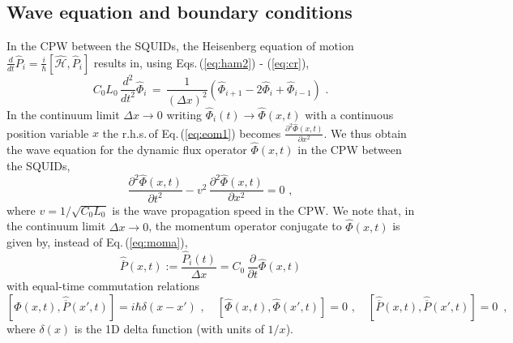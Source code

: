 
\subsection{Wave equation and boundary conditions}

In the CPW between the SQUIDs, the Heisenberg equation of motion 
$\displaystyle \frac{d}{dt} \hat{P}_i = \frac{i}{\hbar} \left[\hat{\mathcal{H}}, \hat{P}_i \right]$ 
results in, using Eqs.\,(\ref{eq:ham2}) - (\ref{eq:cr}), 
%
\begin{equation} \label{eq:eom1}
C_0 L_0 \, \frac{d^2}{dt^2} \hat{\Phi}_i \, = \, 
\frac{1}{(\Delta x)^2} \left(\hat{\Phi}_{i+1} - 2 \hat{\Phi}_i +  \hat{\Phi}_{i-1} \right) \, \, .
\end{equation}
%
In the continuum limit $\Delta x \to 0$ writing $\hat{\Phi}_i(t) \to \hat{\Phi}(x,t)$ 
with a continuous position variable $x$ the r.h.s.\,of Eq.\,(\ref{eq:eom1}) becomes
$\displaystyle \frac{\partial^2\hat{\Phi}(x,t)}{\partial x^2}$. 
We thus obtain the wave equation for the dynamic flux operator
$\hat{\Phi}(x,t)$ in the CPW between the SQUIDs,
%
\begin{equation} \label{eq:eom2}
\frac{\partial^2\hat{\Phi}(x,t)}{\partial t^2} - v^2 \, \frac{\partial^2\hat{\Phi}(x,t)}{\partial x^2} = 0 \, \, ,
\end{equation}
%
where $v = 1 / \sqrt{C_0 L_0}$ is the wave propagation speed in the CPW.
We note that, in the continuum limit $\Delta x \to 0$, 
the momentum operator conjugate to $\hat{\Phi}(x,t)$ is given by,
instead of Eq.\,(\ref{eq:moma}), 
%
\begin{equation} \label{eq:mom2} 
\hat{\overline{P}}(x,t) := \frac{\hat{P}_{i}(t)}{\Delta x} = 
C_0 \, \frac{\partial}{\partial t} \hat{\Phi}(x,t)
\end{equation}
%
with equal-time commutation relations
%
\begin{equation} \label{eq:cr2} 
\left[\hat{\Phi}(x,t), \hat{\overline{P}}(x',t) \right] = i \hbar \delta(x - x') \, \, , \quad 
\left[\hat{\Phi}(x,t), \hat{\Phi}(x',t) \right] = 0 \, \, , \quad 
\left[\hat{\overline{P}}(x,t), \hat{\overline{P}}(x',t) \right] = 0 \, \, \, , 
\end{equation}
%
where $\delta(x)$ is the 1D delta function (with units of $1/x$).

